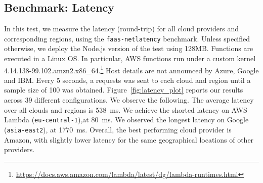 \subsection{Benchmark: Latency}
In this test, we measure the latency (round-trip) for all cloud providers and corresponding regions, using the \texttt{faas-netlatency} benchmark.
Unless specified otherwise, we deploy the Node.js version of the test using 128\gls{MB}.
Functions are executed in a Linux OS.
In particular, AWS functions run under a custom kernel 4.14.138-99.102.amzn2.x86\_64.\footnote{\url{https://docs.aws.amazon.com/lambda/latest/dg/lambda-runtimes.html}} 
Host details are not announced by Azure, Google and IBM.
Every 5 seconds, a requests was sent to each cloud and region until a sample size of 100 was obtained. 
Figure~\ref{fig:latency_plot} reports our results across 39 different configurations. 
We observe the following.
The average latency over all clouds and regions is 538~ms.
We achieve the shorted latency on AWS Lambda (\texttt{eu-central-1}),at 80~ms.
We observed the longest latency  on Google (\texttt{asia-east2}), at 1770~ms. 
Overall, the best performing cloud provider is Amazon, with slightly lower latency for the same geographical locations of other providers.

